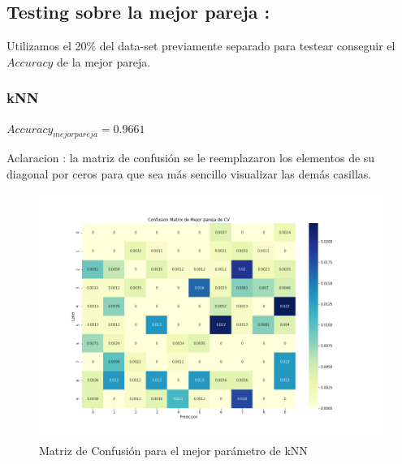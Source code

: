 \documentclass[a4paper,10pt]{article}
\begin{document}
\subsection{ Testing sobre la mejor pareja : }


Utilizamos el 20$\%$ del data-set previamente separado para testear conseguir el $Accuracy$ de la mejor pareja.

\subsubsection{kNN}

$Accuracy_{mejor pareja} = 0.9661 $
\par
\vspace{0.5cm}
Aclaracion : la matriz de confusión se le reemplazaron los elementos de su diagonal por ceros para que sea más sencillo visualizar las demás casillas.
\begin{figure}[H]
    \centering
    \includegraphics[width=14cm]{../images/../images/ConfMatrix_knn.png}%
    \qquad
    \caption{Matriz de Confusión para el mejor parámetro de kNN }
    \label{knn_MatrizConf}%
\end{figure}
\end{document}
